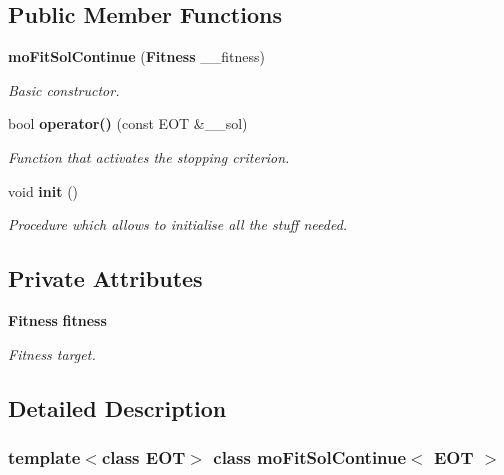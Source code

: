\subsection*{Public Member Functions}
\begin{CompactItemize}
\item 
{\bf moFitSolContinue} ({\bf Fitness} \_\-\_\-fitness)
\begin{CompactList}\small\item\em Basic constructor. \item\end{CompactList}\item 
bool {\bf operator()} (const EOT \&\_\-\_\-sol)
\begin{CompactList}\small\item\em Function that activates the stopping criterion. \item\end{CompactList}\item 
void {\bf init} ()\label{classmo_fit_sol_continue_670bd895b4edfcd3aebb40d2295d7f7c}

\begin{CompactList}\small\item\em Procedure which allows to initialise all the stuff needed. \item\end{CompactList}\end{CompactItemize}
\subsection*{Private Attributes}
\begin{CompactItemize}
\item 
{\bf Fitness} {\bf fitness}\label{classmo_fit_sol_continue_87d0ba8f2f76f61c89317eed5f094dfc}

\begin{CompactList}\small\item\em Fitness target. \item\end{CompactList}\end{CompactItemize}


\subsection{Detailed Description}
\subsubsection*{template$<$class EOT$>$ class moFitSolContinue$<$ EOT $>$}

